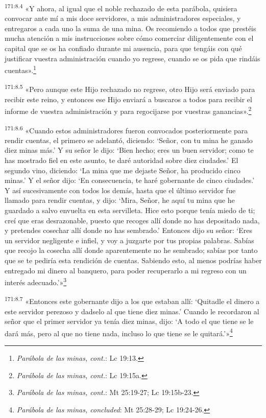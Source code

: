 \par
\textsuperscript{171:8.4} «Y ahora, al igual que el noble rechazado de esta parábola, quisiera convocar ante mí a mis doce servidores, a mis administradores especiales, y entregaros a cada uno la suma de una mina. Os recomiendo a todos que prestéis mucha atención a mis instrucciones sobre cómo comerciar diligentemente con el capital que se os ha confiado durante mi ausencia, para que tengáis con qué justificar vuestra administración cuando yo regrese, cuando se os pida que rindáis cuentas».\footnote{\textit{Parábola de las minas, cont.}: Lc 19:13.}

\par
\textsuperscript{171:8.5} «Pero aunque este Hijo rechazado no regrese, otro Hijo será enviado para recibir este reino, y entonces ese Hijo enviará a buscaros a todos para recibir el informe de vuestra administración y para regocijarse por vuestras ganancias».\footnote{\textit{Parábola de las minas, cont.}: Lc 19:15a.}

\par
\textsuperscript{171:8.6} «Cuando estos administradores fueron convocados posteriormente para rendir cuentas, el primero se adelantó, diciendo: `Señor, con tu mina he ganado diez minas más.' Y su señor le dijo: `Bien hecho; eres un buen servidor; como te has mostrado fiel en este asunto, te daré autoridad sobre diez ciudades.' El segundo vino, diciendo: `La mina que me dejaste Señor, ha producido cinco minas.' Y el señor dijo: `En consecuencia, te haré gobernante de cinco ciudades.' Y así sucesivamente con todos los demás, hasta que el último servidor fue llamado para rendir cuentas, y dijo: `Mira, Señor, he aquí tu mina que he guardado a salvo envuelta en esta servilleta. Hice esto porque tenía miedo de ti; creí que eras desrazonable, puesto que recoges allí donde no has depositado nada, y pretendes cosechar allí donde no has sembrado.' Entonces dijo su señor: `Eres un servidor negligente e infiel, y voy a juzgarte por tus propias palabras. Sabías que recojo la cosecha allí donde aparentemente no he sembrado; sabías por tanto que se te pediría esta rendición de cuentas. Sabiendo esto, al menos podrías haber entregado mi dinero al banquero, para poder recuperarlo a mi regreso con un interés adecuado.'»\footnote{\textit{Parábola de las minas, cont.}: Mt 25:19-27; Lc 19:15b-23.}

\par
\textsuperscript{171:8.7} «Entonces este gobernante dijo a los que estaban allí: `Quitadle el dinero a este servidor perezoso y dadselo al que tiene diez minas.' Cuando le recordaron al señor que el primer servidor ya tenía diez minas, dijo: `A todo el que tiene se le dará más, pero al que no tiene nada, incluso lo que tiene se le quitará.'»\footnote{\textit{Parábola de las minas, concluded}: Mt 25:28-29; Lc 19:24-26.}

